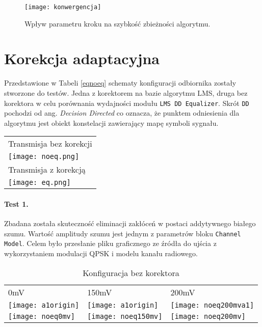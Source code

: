 \begin{figure}[ht]
\centering
\texttt{[image: konwergencja]}
\caption{Wpływ parametru kroku na szybkość zbieżności algorytmu.}
\label{fig:sine4}
\end{figure}

\section{Korekcja adaptacyjna}

Przedstawione w Tabeli \ref{eqnoeq} schematy konfiguracji odbiornika zostały stworzone do testów.
Jedna z korektorem na bazie algorytmu LMS, druga bez korektora w celu porównania wydajności modułu \texttt{LMS DD Equalizer}. 
Skrót \texttt{DD} pochodzi od ang. \textit{Decision Directed} co oznacza, że punktem odniesienia dla algorytmu jest obiekt konstelacji zawierający mapę symboli sygnału. \cite{dd_lms_eq}

\begin{sidewaystable}[t]
\centering
\caption{Diagramy konfiguracji odbiornika}
\label{eqnoeq}
\begin{tabular}{l}
\hline
Transmisja bez korekcji \\
\texttt{[image: noeq.png]}\\ \hline
Transmisja z korekcją   \\
\texttt{[image: eq.png]}\\
\end{tabular}
\end{sidewaystable}

\paragraph{Test 1.}
Zbadana została skuteczność eliminacji zakłóceń w postaci addytywnego białego szumu.
Wartość amplitudy szumu jest jednym z parametrów bloku \texttt{Channel Model}.
Celem było przesłanie pliku graficznego ze źródła do ujścia z wykorzystaniem modulacji QPSK i modelu kanału radiowego.


\begin{table}[ht]
\centering
\caption{Konfiguracja bez korektora}
\label{tab:noeq}
\begin{tabular}{|l|l|l|}
\hline
0mV      & 150mV    & 200mV    \\
\texttt{[image: a1origin]} & \texttt{[image: a1origin]} & \texttt{[image: noeq200mva1]} \\
\texttt{[image: noeq0mv]}   & \texttt{[image: noeq150mv]}   & \texttt{[image: noeq200mv]}  \\ \hline
\end{tabular}
\end{table}

